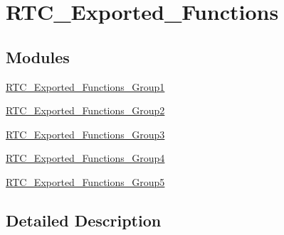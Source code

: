 \hypertarget{group___r_t_c___exported___functions}{}\section{R\+T\+C\+\_\+\+Exported\+\_\+\+Functions}
\label{group___r_t_c___exported___functions}
\subsection*{Modules}
\begin{DoxyCompactItemize}
\item 
\hyperlink{group___r_t_c___exported___functions___group1}{R\+T\+C\+\_\+\+Exported\+\_\+\+Functions\+\_\+\+Group1}
\item 
\hyperlink{group___r_t_c___exported___functions___group2}{R\+T\+C\+\_\+\+Exported\+\_\+\+Functions\+\_\+\+Group2}
\item 
\hyperlink{group___r_t_c___exported___functions___group3}{R\+T\+C\+\_\+\+Exported\+\_\+\+Functions\+\_\+\+Group3}
\item 
\hyperlink{group___r_t_c___exported___functions___group4}{R\+T\+C\+\_\+\+Exported\+\_\+\+Functions\+\_\+\+Group4}
\item 
\hyperlink{group___r_t_c___exported___functions___group5}{R\+T\+C\+\_\+\+Exported\+\_\+\+Functions\+\_\+\+Group5}
\end{DoxyCompactItemize}


\subsection{Detailed Description}
